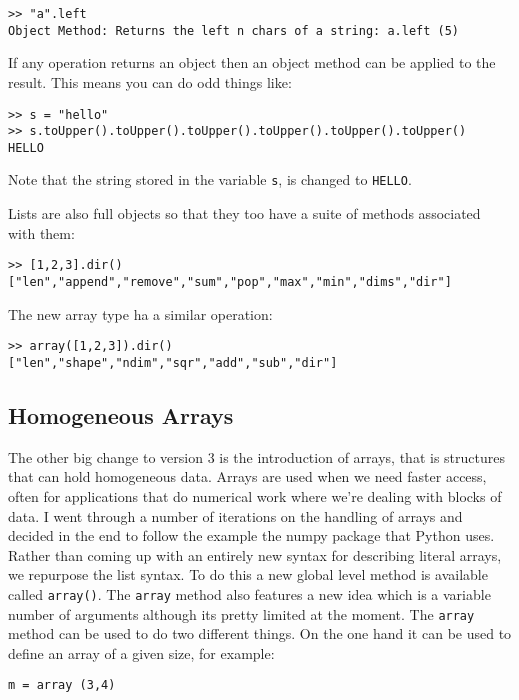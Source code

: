 \begin{lstlisting}
>> "a".left
Object Method: Returns the left n chars of a string: a.left (5)
\end{lstlisting}

If any operation returns an object then an object method can be applied to the result. This means you can do odd things like:

\begin{lstlisting}
>> s = "hello"
>> s.toUpper().toUpper().toUpper().toUpper().toUpper().toUpper()
HELLO
\end{lstlisting}

Note that the string stored in the variable {\tt s}, is changed to {\tt HELLO}.

Lists are also full objects so that they too have a suite of methods associated with them:

\begin{lstlisting}
>> [1,2,3].dir()
["len","append","remove","sum","pop","max","min","dims","dir"]
\end{lstlisting}

The new array type ha a similar operation:

\begin{lstlisting}
>> array([1,2,3]).dir()
["len","shape","ndim","sqr","add","sub","dir"]
\end{lstlisting}


\subsection{Homogeneous Arrays}

The other big change to version 3 is the introduction of arrays, that is structures that can hold homogeneous data. Arrays are used when we need faster access, often for applications that do numerical work where we're dealing with blocks of data.  I went through a number of iterations on the handling of arrays and decided in the end to follow the example the numpy package that Python uses. Rather than coming up with an entirely new syntax for describing literal arrays, we repurpose the list syntax. To do this a new global level method is available called {\tt array()}. The {\tt array} method also features a new idea which is a variable number of arguments although its pretty limited at the moment. The {\tt array} method can be used to do two different things. On the one hand it can be used to define an array of a given size, for example:

\begin{lstlisting}
m = array (3,4)
\end{lstlisting}

